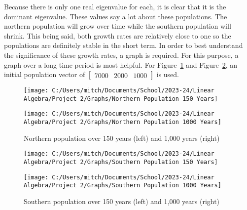 \documentclass{article}
\begin{document}
    Because there is only one real eigenvalue for each, it is clear that it is the dominant eigenvalue.
    These values say a lot about these populations.
    The northern population will grow over time while the southern population will shrink.
    This being said, both growth rates are relatively close to one so the populations are definitely stable in the short term.
    In order to best understand the significance of these growth rates, a graph is required.
    For this purpose, a graph over a long time period is most helpful.
    For Figure~\ref{fig:north_long_term} and Figure~\ref{fig:south_long_term}, an initial population vector of $\begin{bmatrix} 7000 & 2000 & 1000\end{bmatrix}$ is used.

    \begin{figure} [!h]
        \begin{minipage}{0.5\linewidth}
            \centering
            \texttt{[image: C:/Users/mitch/Documents/School/2023-24/Linear Algebra/Project 2/Graphs/Northern Population 150 Years]}
        \end{minipage}\hfill
        \begin{minipage}{0.5\linewidth}
            \centering
            \texttt{[image: C:/Users/mitch/Documents/School/2023-24/Linear Algebra/Project 2/Graphs/Northern Population 1000 Years]}
        \end{minipage}
        \caption{Northern population over 150 years (left) and 1,000 years (right)}
        \label{fig:north_long_term}
    \end{figure}

    \begin{figure} [!h]
        \begin{minipage}{0.5\linewidth}
            \centering
            \texttt{[image: C:/Users/mitch/Documents/School/2023-24/Linear Algebra/Project 2/Graphs/Southern Population 150 Years]}
        \end{minipage}\hfill
        \begin{minipage}{0.5\linewidth}
            \centering
            \texttt{[image: C:/Users/mitch/Documents/School/2023-24/Linear Algebra/Project 2/Graphs/Southern Population 1000 Years]}
        \end{minipage}
        \caption{Southern population over 150 years (left) and 1,000 years (right)}
        \label{fig:south_long_term}
    \end{figure}
\end{document}
